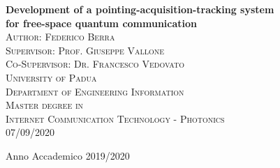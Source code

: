 \begin{titlepage}
\begin{center}


{\LARGE \bfseries Development of a pointing-acquisition-tracking system\\ for free-space quantum communication}\\[2cm]

\textsc{\large Author: Federico Berra}\\
\textsc{\large Supervisor: Prof. Giuseppe Vallone}\\
\textsc{\large Co-Supervisor: Dr. Francesco Vedovato}\\[1.2cm]

\textsc{\LARGE University of Padua}\\[1.2cm]

\textsc{\Large Department of Engineering Information}\\[1.2cm]

\textsc{\Large Master degree in}\\[0.5cm]
\textsc{\Large Internet Communication Technology - Photonics}\\[2cm]
\textsc{\large 07/09/2020}\\
\vfill

{\large Anno Accademico 2019/2020}
\end{center}
\end{titlepage}
